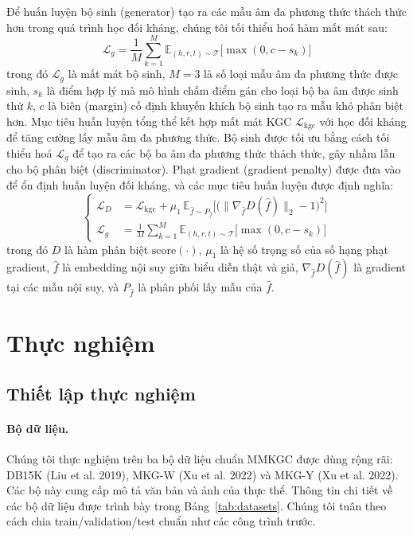 \documentclass[10pt,twocolumn,a4paper]{article}
\newcommand{\score}{\mathrm{score}}
\begin{document}
Để huấn luyện bộ sinh (generator) tạo ra các mẫu âm đa phương thức thách thức hơn trong quá trình học đối kháng, chúng tôi tối thiểu hoá hàm mất mát sau:
\begin{equation}
\mathcal{L}_g = \frac{1}{M}\sum_{k=1}^{M}\mathbb{E}_{(h,r,t)\sim\mathcal{T}}\big[\max(0, c - s_k)\big]
\label{eq:13}
\end{equation}
trong đó $\mathcal{L}_g$ là mất mát bộ sinh, $M = 3$ là số loại mẫu âm đa phương thức được sinh, $s_k$ là điểm hợp lý mà mô hình chấm điểm gán cho loại bộ ba âm được sinh thứ $k$, $c$ là biên (margin) cố định khuyến khích bộ sinh tạo ra mẫu khó phân biệt hơn. Mục tiêu huấn luyện tổng thể kết hợp mất mát KGC $\mathcal{L}_{\mathrm{kgc}}$ với học đối kháng để tăng cường lấy mẫu âm đa phương thức. Bộ sinh được tối ưu bằng cách tối thiểu hoá $\mathcal{L}_g$ để tạo ra các bộ ba âm đa phương thức thách thức, gây nhầm lẫn cho bộ phân biệt (discriminator). Phạt gradient (gradient penalty) được đưa vào để ổn định huấn luyện đối kháng, và các mục tiêu huấn luyện được định nghĩa:
\begin{equation}
\left\{
\begin{aligned}
\mathcal{L}_D &= \mathcal{L}_{\mathrm{kgc}} + \mu_1\,\mathbb{E}_{\hat{f}\sim P_{\hat{f}}}\Big[\big(\|\nabla_{\hat{f}} D(\hat{f})\|_2 - 1\big)^2\Big]\\
\mathcal{L}_g &= \frac{1}{M}\sum_{k=1}^{M}\mathbb{E}_{(h,r,t)\sim\mathcal{T}}\big[\max(0, c - s_k)\big]
\end{aligned}
\right.
\label{eq:14}
\end{equation}
trong đó $D$ là hàm phân biệt $\score(\cdot)$, $\mu_1$ là hệ số trọng số của số hạng phạt gradient, $\hat{f}$ là embedding nội suy giữa biểu diễn thật và giả, $\nabla_{\hat{f}} D(\hat{f})$ là gradient tại các mẫu nội suy, và $P_{\hat{f}}$ là phân phối lấy mẫu của $\hat{f}$.

\section{Thực nghiệm}

\subsection{Thiết lập thực nghiệm}

\paragraph{Bộ dữ liệu.}
Chúng tôi thực nghiệm trên ba bộ dữ liệu chuẩn MMKGC được dùng rộng rãi: DB15K (Liu et al. 2019), MKG-W (Xu et al. 2022) và MKG-Y (Xu et al. 2022). Các bộ này cung cấp mô tả văn bản và ảnh của thực thể. Thông tin chi tiết về các bộ dữ liệu được trình bày trong Bảng~\ref{tab:datasets}. Chúng tôi tuân theo cách chia train/validation/test chuẩn như các công trình trước.
\end{document}
